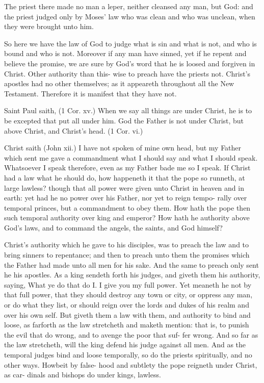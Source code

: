 \documentclass{custom}
\begin{document}
The priest there made no man a leper, neither cleansed 
any man, but God: and the priest judged only by Moses' 
law who was clean and who was unclean, when they were 
brought unto him. 

So here we have the law of God to judge what is sin and 
what is not, and who is bound and who is not. Moreover 
if any man have sinned, yet if he repent and believe the 
promise, we are sure by God's word that he is loosed 
and forgiven in Christ. Other authority than this- 
wise to preach have the priests not. Christ's apostles 
had no other themselves; as it appeareth throughout all 
the New Testament. Therefore it is manifest that they 
have not. 

Saint Paul saith, (1 Cor. xv.) When we say all things
are under Christ, he is to be excepted that put all under
him. God the Father is not under Christ, but above
Christ, and Christ's head. (1 Cor. vi.)

Christ saith (John xii.) I have not spoken of mine own
head, but my Father which sent me gave a commandment
what I should say and what I should speak. Whatsoever
I speak therefore, even as my Father bade me so I speak.
If Christ had a law what he should do, how happeneth it 
that the pope so runneth, at large lawless? though that all 
power were given unto Christ in heaven and in earth: yet 
had he no power over his Father, nor yet to reign tempo- 
rally over temporal princes, but a commandment to obey 
them. How hath the pope then such temporal authority 
over king and emperor? How hath he authority above 
God's laws, and to command the angels, the saints, and 
God himself? 

Christ's authority which he gave to his disciples, was to 
preach the law and to bring sinners to repentance; and 
then to preach unto them the promises which the Father 
had made unto all men for his sake. And the same to 
preach only sent he his apostles. As a king sendeth forth 
his judges, and giveth them his authority, saying, What ye 
do that do I. I give you my full power. Yet meaneth 
he not by that full power, that they should destroy any 
town or city, or oppress any man, or do what they list, or 
should reign over the lords and dukes of his realm and 
over his own self. But giveth them a law with them, and 
authority to bind and loose, as farforth as the law 
stretcheth and maketh mention: that is, to punish the 
evil that do wrong, and to avenge the poor that suf- 
fer wrong. And so far as the law stretcheth, will 
the king defend his judge against all men. And as the 
temporal judges bind and loose temporally, so do the 
priests spiritually, and no other ways. Howbeit by false- 
hood and subtlety the pope reigneth under Christ, as car- 
dinals and bishops do under kings, lawless. 
\end{document}

